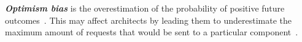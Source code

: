     \textbf{\textit{Optimism bias}} is the overestimation of the probability of positive future outcomes~\cite{sharot2011optimism}. 
    \color{black}
    This may affect architects by leading them to underestimate the maximum amount of requests that would be sent to a particular component~\cite{Zalewski2017}.
    \color{black}


